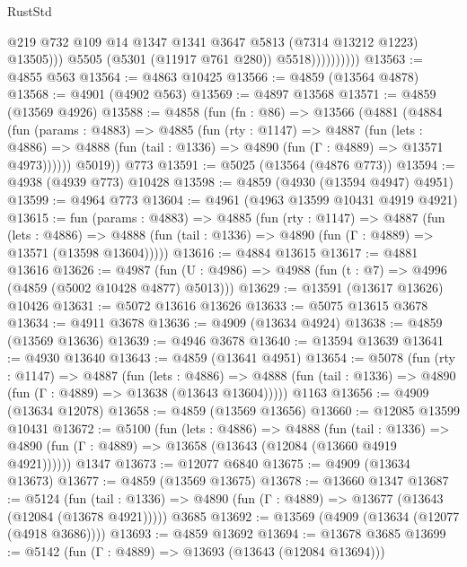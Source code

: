 \begin{lexlean}{RustStd}
\begin{coremodule}
                              @219
                              @732
                              @109
                              @14
                              @1347
                              @1341
                              @3647
                              @5813
                              (@7314 @13212 @1223)
                              @13505)))
                        @5505
                        (@5301 (@11917 @761 @280))
                        @5518))))))))))
@13563 := @4855 @563
@13564 := @4863 @10425
@13566 := @4859 (@13564 @4878)
@13568 := @4901 (@4902 @563)
@13569 := @4897 @13568
@13571 := @4859 (@13569 @4926)
@13588 := @4858
    (fun (fn : @86) =>
    @13566
      (@4881
        (@4884
          (fun (params : @4883) =>
          @4885
            (fun (rty : @1147) =>
            @4887
              (fun (lets : @4886) =>
              @4888 (fun (tail : @1336) => @4890 (fun (Γ : @4889) => @13571 @4973))))))
        @5019))
    @773
@13591 := @5025 (@13564 (@4876 @773))
@13594 := @4938 (@4939 @773) @10428
@13598 := @4859 (@4930 (@13594 @4947) @4951)
@13599 := @4964 @773
@13604 := @4961 (@4963 @13599 @10431 @4919 @4921)
@13615 := fun (params : @4883) =>
  @4885
    (fun (rty : @1147) =>
    @4887
      (fun (lets : @4886) =>
      @4888 (fun (tail : @1336) => @4890 (fun (Γ : @4889) => @13571 (@13598 @13604)))))
@13616 := @4884 @13615
@13617 := @4881 @13616
@13626 := @4987
    (fun (U : @4986) => @4988 (fun (t : @7) => @4996 (@4859 (@5002 @10428 @4877) @5013)))
@13629 := @13591 (@13617 @13626) @10426
@13631 := @5072 @13616 @13626
@13633 := @5075 @13615 @3678
@13634 := @4911 @3678
@13636 := @4909 (@13634 @4924)
@13638 := @4859 (@13569 @13636)
@13639 := @4946 @3678
@13640 := @13594 @13639
@13641 := @4930 @13640
@13643 := @4859 (@13641 @4951)
@13654 := @5078
    (fun (rty : @1147) =>
    @4887
      (fun (lets : @4886) =>
      @4888 (fun (tail : @1336) => @4890 (fun (Γ : @4889) => @13638 (@13643 @13604)))))
    @1163
@13656 := @4909 (@13634 @12078)
@13658 := @4859 (@13569 @13656)
@13660 := @12085 @13599 @10431
@13672 := @5100
    (fun (lets : @4886) =>
    @4888
      (fun (tail : @1336) =>
      @4890 (fun (Γ : @4889) => @13658 (@13643 (@12084 (@13660 @4919 @4921))))))
    @1347
@13673 := @12077 @6840
@13675 := @4909 (@13634 @13673)
@13677 := @4859 (@13569 @13675)
@13678 := @13660 @1347
@13687 := @5124
    (fun (tail : @1336) => @4890 (fun (Γ : @4889) => @13677 (@13643 (@12084 (@13678 @4921)))))
    @3685
@13692 := @13569 (@4909 (@13634 (@12077 (@4918 @3686))))
@13693 := @4859 @13692
@13694 := @13678 @3685
@13699 := @5142 (fun (Γ : @4889) => @13693 (@13643 (@12084 @13694)))

\end{coremodule}
\end{lexlean}
